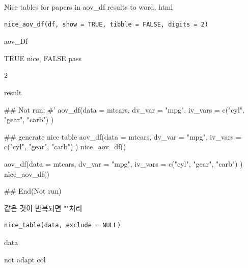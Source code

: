 \documentclass[a4paper]{book}
\begin{document}
%
\begin{Description}
Nice tables for papers in aov\_df results  to  word, html
\end{Description}
%
\begin{Usage}
\begin{verbatim}
nice_aov_df(df, show = TRUE, tibble = FALSE, digits = 2)
\end{verbatim}
\end{Usage}
%
\begin{Arguments}
\begin{ldescription}
\item[\code{df}] aov\_Df

\item[\code{show}] TRUE nice, FALSE pass

\item[\code{digits}] 2
\end{ldescription}
\end{Arguments}
%
\begin{Value}
result
\end{Value}
%
\begin{Examples}
\begin{ExampleCode}

## Not run: 
#'
aov_df(data = mtcars,
       dv_var = "mpg",
       iv_vars = c("cyl", "gear", "carb") )

## generate nice table
aov_df(data = mtcars,
       dv_var = "mpg",
       iv_vars = c("cyl", "gear", "carb") )%
  nice_aov_df()


aov_df(data = mtcars,
       dv_var = "mpg",
       iv_vars = c("cyl", "gear", "carb") )%
  nice_aov_df() %



## End(Not run)
\end{ExampleCode}
\end{Examples}
%
\begin{Description}
같은 것이 반복되면 ""처리
\end{Description}
%
\begin{Usage}
\begin{verbatim}
nice_table(data, exclude = NULL)
\end{verbatim}
\end{Usage}
%
\begin{Arguments}
\begin{ldescription}
\item[\code{data}] data

\item[\code{exclude}] not adapt col
\end{ldescription}
\end{Arguments}
\end{document}
